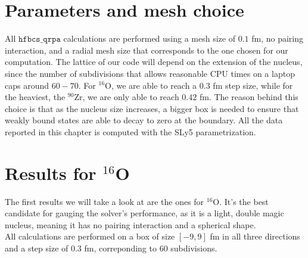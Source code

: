 \section{Parameters and mesh choice}
All $\texttt{hfbcs\_qrpa}$ calculations are performed using a mesh size of $0.1$ fm, no pairing interaction, and a radial mesh size that corresponds to the one chosen for our computation. The lattice of our code will depend on the extension of the nucleus, since the number of subdivisions that allows reasonable CPU times on a laptop caps around $60-70$. For $^{16}$O, we are able to reach a $0.3$ fm step size, while for the heaviest, the $^{90}$Zr, we are only able to reach $0.42$ fm. The reason behind this choice is that as the nucleus size increases, a bigger box is needed to ensure that weakly bound states are able to decay to zero at the boundary. All the data reported in this chapter is computed with the SLy5 parametrization.
\section{Results for \(^{16}\)O}
The first results we will take a look at are the ones for $^{16}$O. It's the best candidate for gauging the solver's performance, as it is a light, double magic nucleus, meaning it has no pairing interaction and a spherical shape.
\\All calculations are performed on a box of size $[-9, 9]$ fm in all three directions and a step size of $0.3$ fm, correponding to $60$ subdivisions.
